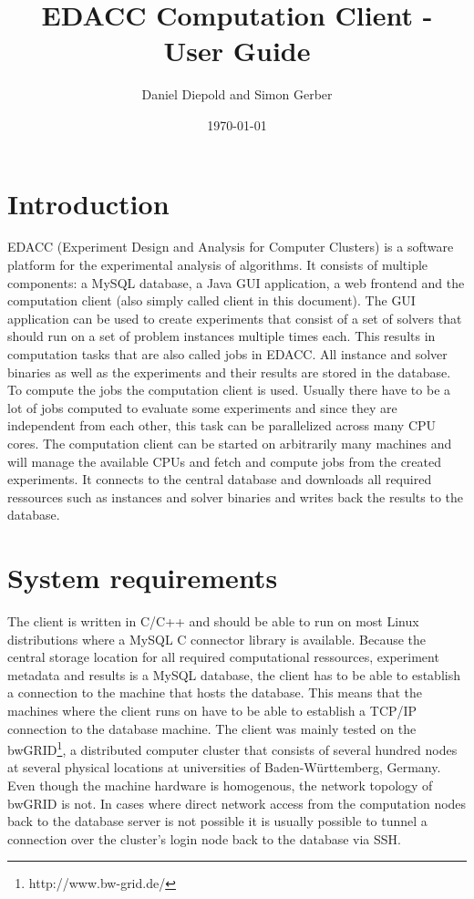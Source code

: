 \documentclass{article}
\title{EDACC Computation Client - User Guide}
\author{Daniel Diepold and Simon Gerber}
\date{\today}
\begin{document}
\maketitle
\newpage

\section{Introduction}
EDACC (Experiment Design and Analysis for Computer Clusters) is a software platform for the experimental analysis of algorithms.
It consists of multiple components: a MySQL database, a Java GUI application, a web frontend and the computation client (also simply called client in this document).
The GUI application can be used to create experiments that consist of a set of solvers that should run on a set of problem instances multiple times each.
This results in computation tasks that are also called jobs in EDACC. All instance and solver binaries as well as the experiments
and their results are stored in the database. To compute the jobs the computation client is used. Usually there have to be a lot of jobs computed to evaluate some experiments
and since they are independent from each other, this task can be parallelized across many CPU cores. The computation client can be started on arbitrarily many
machines and will manage the available CPUs and fetch and compute jobs from the created experiments. It connects to the central database and downloads all required ressources
such as instances and solver binaries and writes back the results to the database.

\section{System requirements}
The client is written in C/C++ and should be able to run on most Linux distributions where a MySQL C connector library is available.
Because the central storage location for all required computational ressources, experiment metadata and results is a MySQL database, the client has to be able
to establish a connection to the machine that hosts the database. This means that the machines where the client runs on have to be able to establish a TCP/IP connection
to the database machine. The client was mainly tested on the bwGRID\footnote{{http://www.bw-grid.de/}}, a distributed computer cluster that consists of several hundred
nodes at several physical locations at universities of Baden-Württemberg, Germany. Even though the machine hardware is homogenous, the network topology of bwGRID is not.
In cases where direct network access from the computation nodes back to the database server is not possible it is usually possible to tunnel a connection
over the cluster's login node back to the database via SSH.
\end{document}
